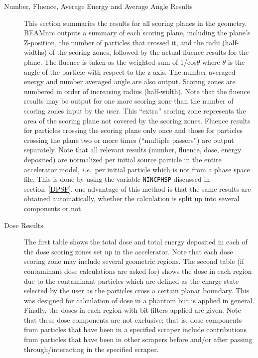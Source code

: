 \documentclass[12pt,twoside]{article}
\newcommand{\ie}{{\em i.e.}}
\begin{document}
\begin{description}
\begin{description}
\item [Number, Fluence, Average Energy and Average Angle Results]
This section summaries the results for all scoring planes in
the geometry.  BEAMnrc outputs a summary of each scoring plane, including
the plane's Z-position, the number of particles that crossed it, and the
radii (half-widths) of the scoring zones, followed by the actual fluence
results for the plane.  The fluence is taken as the weighted
sum of 1/cos$\theta$
where $\theta$ is the angle of the particle with respect to the z-axis.
The number averaged energy and number averaged angle are also output.
Scoring zones are numbered in order of
increasing radius (half-width).  Note that the fluence results may be
output for one more scoring zone than the number of scoring zones input
by the user.  This ``extra'' scoring zone represents the area of the
scoring plane not covered by the scoring zones.  Fluence results for
particles crossing the scoring plane only once and those for particles
crossing the plane two or more times (``multiple passers'') are output
separately.  Note that all relevant results (number, fluence, dose,
energy deposited) are normalized per initial
source particle in the entire accelerator model, \ie\ per initial
particle which is not from a phase space file.  This is done by using
the variable \verb+NINCPHSP+ discussed in section~\ref{DPSF}.  one
advantage of this method is that the same results are obtained
automatically,  whether the calculation is split up into several components
or not.

\item [Dose Results]
The first table shows the total dose and total energy deposited in each
of the dose scoring zones set up in the accelerator.
Note that each dose scoring zone may include several geometric regions.
The second table (if contaminant dose calculations are asked for)
shows the dose in each region
due to the contaminant particles which are defined as the
charge state selected by the user as the particles cross a certain
planar boundary.  This was designed for calculation of dose in a phantom
but is applied in general.
Finally, the doses in each region with bit filters applied are given.
Note that these dose components are
not exclusive; that is, dose components from particles that have
been in a specified scraper include contributions from particles that
have been in other scrapers before and/or after passing
through/interacting in the specified scraper.


\end{description}
\end{description}
\end{document}
